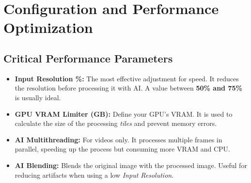 \documentclass[11pt, a4paper]{article}
\begin{document}
\section{Configuration and Performance Optimization}

\subsection{Critical Performance Parameters}
\begin{itemize}[leftmargin=*]
    \item \textbf{Input Resolution \%:} The most effective adjustment for speed. It reduces the resolution before processing it with AI. A value between \textbf{50\% and 75\%} is usually ideal.
    \item \textbf{GPU VRAM Limiter (GB):} Define your GPU's VRAM. It is used to calculate the size of the processing \textit{tiles} and prevent memory errors.
    \item \textbf{AI Multithreading:} For videos only. It processes multiple frames in parallel, speeding up the process but consuming more VRAM and CPU.
    \item \textbf{AI Blending:} Blends the original image with the processed image. Useful for reducing artifacts when using a low \textit{Input Resolution}.
\end{itemize}
\end{document}
